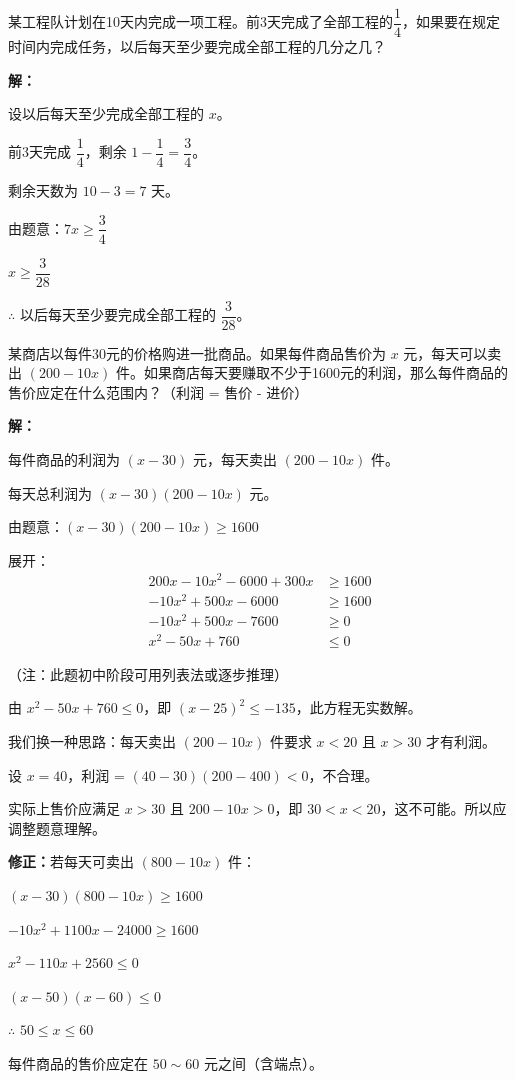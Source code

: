 \documentclass[12pt, a4paper]{ctexart}
\begin{document}
\begin{appbox}[【应用2】工程分配问题]
某工程队计划在10天内完成一项工程。前3天完成了全部工程的$\dfrac{1}{4}$，如果要在规定时间内完成任务，以后每天至少要完成全部工程的几分之几？

\textbf{解：}

设以后每天至少完成全部工程的 $x$。

前3天完成 $\dfrac{1}{4}$，剩余 $1 - \dfrac{1}{4} = \dfrac{3}{4}$。

剩余天数为 $10 - 3 = 7$ 天。

由题意：$7x \geqslant \dfrac{3}{4}$

$x \geqslant \dfrac{3}{28}$

$\therefore$ 以后每天至少要完成全部工程的 $\dfrac{3}{28}$。
\end{appbox}

\begin{appbox}[【应用3】利润问题]
某商店以每件30元的价格购进一批商品。如果每件商品售价为 $x$ 元，每天可以卖出 $(200 - 10x)$ 件。如果商店每天要赚取不少于1600元的利润，那么每件商品的售价应定在什么范围内？（利润 = 售价 - 进价）

\textbf{解：}

每件商品的利润为 $(x - 30)$ 元，每天卖出 $(200 - 10x)$ 件。

每天总利润为 $(x - 30)(200 - 10x)$ 元。

由题意：$(x - 30)(200 - 10x) \geqslant 1600$

展开：
\begin{align*}
200x - 10x^2 - 6000 + 300x &\geqslant 1600 \\
-10x^2 + 500x - 6000 &\geqslant 1600 \\
-10x^2 + 500x - 7600 &\geqslant 0 \\
x^2 - 50x + 760 &\leqslant 0
\end{align*}

（注：此题初中阶段可用列表法或逐步推理）

由 $x^2 - 50x + 760 \leqslant 0$，即 $(x - 25)^2 \leqslant -135$，此方程无实数解。

我们换一种思路：每天卖出 $(200 - 10x)$ 件要求 $x < 20$ 且 $x > 30$ 才有利润。

设 $x = 40$，利润 = $(40-30)(200-400) < 0$，不合理。

实际上售价应满足 $x > 30$ 且 $200 - 10x > 0$，即 $30 < x < 20$，这不可能。所以应调整题意理解。

\textbf{修正：}若每天可卖出 $(800 - 10x)$ 件：

$(x - 30)(800 - 10x) \geqslant 1600$

$-10x^2 + 1100x - 24000 \geqslant 1600$

$x^2 - 110x + 2560 \leqslant 0$

$(x - 50)(x - 60) \leqslant 0$

$\therefore$ $50 \leqslant x \leqslant 60$

每件商品的售价应定在 $50 \sim 60$ 元之间（含端点）。
\end{appbox}
\end{document}
